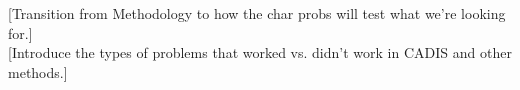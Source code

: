 [Transition from Methodology to how the char probs will test what we're looking
for.] \\

[Introduce the types of problems that worked vs. didn't work in CADIS and other
methods.] \\
